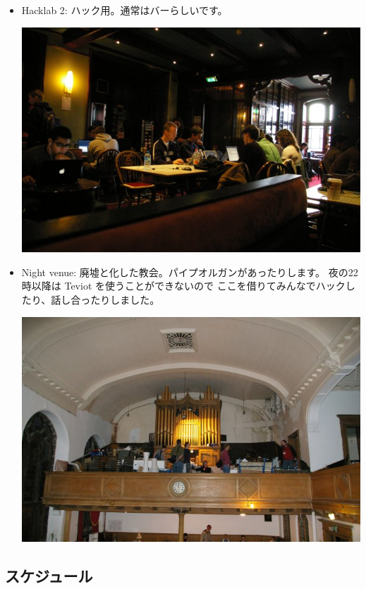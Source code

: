 \documentclass[mingoth,a4paper]{jsarticle}
\begin{document}
\begin{itemize}
  \item Hacklab 2: ハック用。通常はバーらしいです。\\
	\begin{minipage}{0.4\hsize}
	\includegraphics[width=0.8\hsize]{image200706/debconf7-hacklab01.jpg}
	\end{minipage}
  \item Night venue:
	廃墟と化した教会。パイプオルガンがあったりします。
	夜の22時以降は Teviot を使うことができないので
	ここを借りてみんなでハックしたり、話し合ったりしました。
\\
     	\begin{minipage}{0.4\hsize}
     	\includegraphics[width=0.8\hsize]{image200706/debconf7-elsewhere.jpg}
     	\end{minipage}
     	\begin{minipage}{0.4\hsize}
     	\end{minipage}
\end{itemize} 

\subsection{スケジュール}
\end{document}
